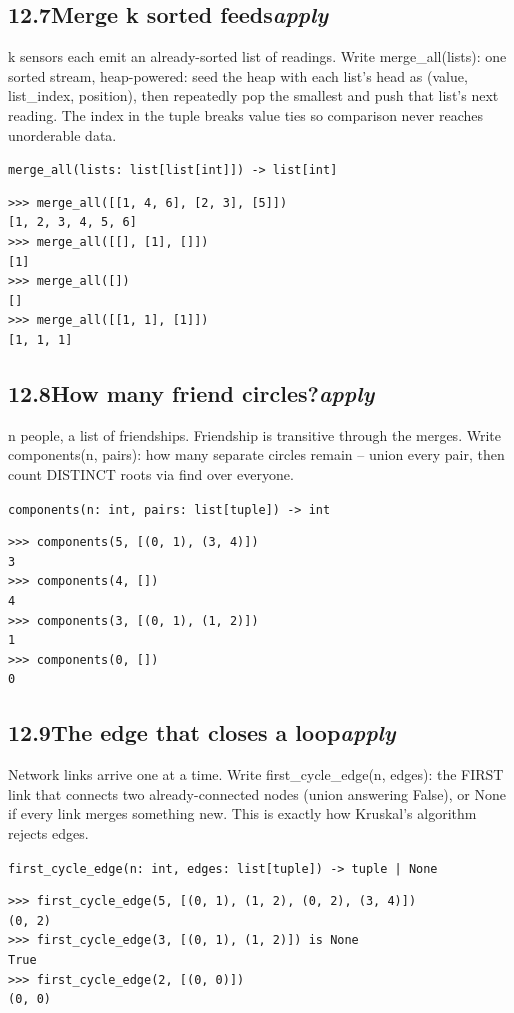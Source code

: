 \documentclass[10pt,letterpaper]{book}
\begin{document}
\subsection*{12.7\quad Merge k sorted feeds\hfill\textnormal{\textit{apply}}}
k sensors each emit an already-sorted list of readings. Write merge\_all(lists): one sorted stream, heap-powered: seed the heap with each list's head as (value, list\_index, position), then repeatedly pop the smallest and push that list's next reading. The index in the tuple breaks value ties so comparison never reaches unorderable data.

\noindent\texttt{merge\_all(lists: list[list[int]]) -> list[int]}
\begin{lstlisting}[style=ex]
>>> merge_all([[1, 4, 6], [2, 3], [5]])
[1, 2, 3, 4, 5, 6]
>>> merge_all([[], [1], []])
[1]
>>> merge_all([])
[]
>>> merge_all([[1, 1], [1]])
[1, 1, 1]
\end{lstlisting}
\subsection*{12.8\quad How many friend circles?\hfill\textnormal{\textit{apply}}}
n people, a list of friendships. Friendship is transitive through the merges. Write components(n, pairs): how many separate circles remain -- union every pair, then count DISTINCT roots via find over everyone.

\noindent\texttt{components(n: int, pairs: list[tuple]) -> int}
\begin{lstlisting}[style=ex]
>>> components(5, [(0, 1), (3, 4)])
3
>>> components(4, [])
4
>>> components(3, [(0, 1), (1, 2)])
1
>>> components(0, [])
0
\end{lstlisting}
\subsection*{12.9\quad The edge that closes a loop\hfill\textnormal{\textit{apply}}}
Network links arrive one at a time. Write first\_cycle\_edge(n, edges): the FIRST link that connects two already-connected nodes (union answering False), or None if every link merges something new. This is exactly how Kruskal's algorithm rejects edges.

\noindent\texttt{first\_cycle\_edge(n: int, edges: list[tuple]) -> tuple | None}
\begin{lstlisting}[style=ex]
>>> first_cycle_edge(5, [(0, 1), (1, 2), (0, 2), (3, 4)])
(0, 2)
>>> first_cycle_edge(3, [(0, 1), (1, 2)]) is None
True
>>> first_cycle_edge(2, [(0, 0)])
(0, 0)
\end{lstlisting}
\end{document}
